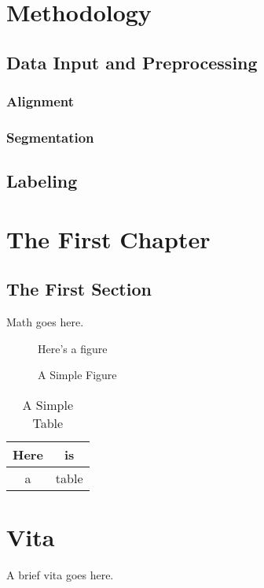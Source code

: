 \documentclass[final]{ukthesis}
\begin{document}
\chapter{Methodology}
\section{Data Input and Preprocessing}
\subsection{Alignment}
\subsection{Segmentation}


\section{Labeling}


\chapter{The First Chapter}
\section{The First Section}
Math goes here.
\begin{figure}[h]
\centering
Here's a figure
\caption{A Simple Figure}
\end{figure}
\begin{table}[h]
\centering
\begin{tabular}{c|c}
Here & is \\
\hline
a & table
\end{tabular}
\caption{A Simple Table}
\end{table}
\copyrightnotice
\backmatter

\chapter{Vita}
A brief vita goes here.
\end{document}
